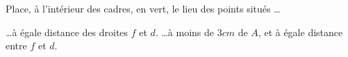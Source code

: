 %
%
Place, à l'intérieur des cadres, en vert, le lieu des points situés \dots
  \begin{tasks}
    \task \dots à égale distance des droites $f$ et $d$.
    \task \dots à moins de $3cm$ de $A$, et à égale distance entre $f$ et $d$.
  \end{tasks}
